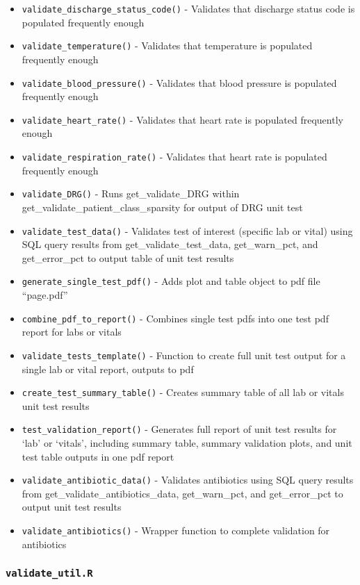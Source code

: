 \documentclass[
]{book}
\providecommand{\tightlist}{%
  \setlength{\itemsep}{0pt}\setlength{\parskip}{0pt}}
\begin{document}
\begin{itemize}
\tightlist
\item
  \texttt{validate\_discharge\_status\_code()} - Validates that discharge status code is populated frequently enough
\item
  \texttt{validate\_temperature()} - Validates that temperature is populated frequently enough
\item
  \texttt{validate\_blood\_pressure()} - Validates that blood pressure is populated frequently enough
\item
  \texttt{validate\_heart\_rate()} - Validates that heart rate is populated frequently enough
\item
  \texttt{validate\_respiration\_rate()} - Validates that heart rate is populated frequently enough
\item
  \texttt{validate\_DRG()} - Runs get\_validate\_DRG within get\_validate\_patient\_class\_sparsity for output of DRG unit test
\item
  \texttt{validate\_test\_data()} - Validates test of interest (specific lab or vital) using SQL query results from get\_validate\_test\_data, get\_warn\_pct, and get\_error\_pct to output table of unit test results
\item
  \texttt{generate\_single\_test\_pdf()} - Adds plot and table object to pdf file ``page.pdf''
\item
  \texttt{combine\_pdf\_to\_report()} - Combines single test pdfs into one test pdf report for labs or vitals
\item
  \texttt{validate\_tests\_template()} - Function to create full unit test output for a single lab or vital report, outputs to pdf
\item
  \texttt{create\_test\_summary\_table()} - Creates summary table of all lab or vitals unit test results
\item
  \texttt{test\_validation\_report()} - Generates full report of unit test results for `lab' or `vitals', including summary table, summary validation plots, and unit test table outputs in one pdf report
\item
  \texttt{validate\_antibiotic\_data()} - Validates antibiotics using SQL query results from get\_validate\_antibiotics\_data, get\_warn\_pct, and get\_error\_pct to output unit test results
\item
  \texttt{validate\_antibiotics()} - Wrapper function to complete validation for antibiotics
\end{itemize}

\hypertarget{validate_util.r-1}{%
\subsubsection{\texorpdfstring{\texttt{validate\_util.R}}{validate\_util.R}}\label{validate_util.r-1}}
\end{document}
